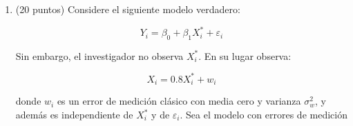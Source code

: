 \documentclass[10pt,a4paper]{article}
\begin{document}
\begin{enumerate}
\begin{enumerate}
        Por lo tanto:
        \[
        \boxed{\hat Y_1=71,\ \hat Y_2=63.6,\ \hat Y_3=81.9,\ \hat Y_4=57.7,\ \hat Y_5=73.3,\ \hat Y_6=77.8}
        \]

        \item Los residuos de predicción se calculan como:
        \[
        \hat u_i = Y_i-\hat Y_i
        \]

        Entonces:

        \[
        \hat u_1=69-71=-2
        \]

        \[
        \hat u_2=59-63.6=-4.6
        \]

        \[
        \hat u_3=79-81.9=-2.9
        \]

        \[
        \hat u_4=54-57.7=-3.7
        \]

        \[
        \hat u_5=71-73.3=-2.3
        \]

        \[
        \hat u_6=75-77.8=-2.8
        \]

        Por lo tanto:
        \[
        \boxed{\hat u_1=-2,\ \hat u_2=-4.6,\ \hat u_3=-2.9,\ \hat u_4=-3.7,\ \hat u_5=-2.3,\ \hat u_6=-2.8}
        \]

        La varianza del error en la muestra out-of-time es:
        \[
        \hat\sigma^2_{OOT}=\frac{1}{m}\sum_{i=1}^{m}\hat u_i^2
        \]

        Como \(m=6\), primero calculamos:
        \[
        \sum \hat u_i^2
        =
        (-2)^2+(-4.6)^2+(-2.9)^2+(-3.7)^2+(-2.3)^2+(-2.8)^2
        \]

        \[
        =4+21.16+8.41+13.69+5.29+7.84
        \]

        \[
        =60.39
        \]

        Entonces:
        \[
        \hat\sigma^2_{OOT}=\frac{60.39}{6}=10.065
        \]

        Por lo tanto:
        \[
        \boxed{\hat\sigma^2_{OOT}=10.07}
        \]
    \end{enumerate}



    \item (20 puntos) Considere el siguiente modelo verdadero:

\[
Y_i = \beta_0 + \beta_1 X_i^* + \varepsilon_i
\]

Sin embargo, el investigador no observa \(X_i^*\). En su lugar observa:

\[
X_i = 0.8X_i^* + w_i
\]

donde \(w_i\) es un error de medición clásico con media cero y varianza \(\sigma_w^2\), y además es independiente de \(X_i^*\) y de \(\varepsilon_i\). Sea el modelo con errores de medición


\end{enumerate}
\end{document}
